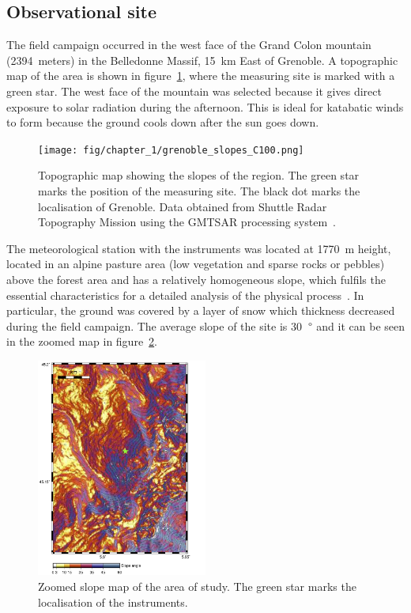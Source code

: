 \subsection{Observational site}

The field campaign occurred in the west face of the Grand Colon mountain (2394~meters) in the Belledonne Massif, 15~km East of Grenoble. A topographic map of the area is shown in figure~\ref{fig:obs_site}, where the measuring site is marked with a green star. The west face of the mountain was selected because it gives direct exposure to solar radiation during the afternoon. This is ideal for katabatic winds to form because the ground cools down after the sun goes down.

\begin{figure}[!ht]
  \begin{center}
  \texttt{[image: fig/chapter\_1/grenoble\_slopes\_C100.png]}
  \caption{Topographic map showing the slopes of the region. The green star marks the position of the measuring site. The black dot marks the localisation of Grenoble. Data obtained from Shuttle Radar Topography Mission using the GMTSAR processing system~\citep{sandwell2011gmtsar}.}
  \label{fig:obs_site}
  \end{center}
\end{figure}

The meteorological station with the instruments was located at 1770~m height, located in an alpine pasture area (low vegetation and sparse rocks or pebbles) above the forest area and
has a relatively homogeneous slope, which fulfils the essential characteristics for a detailed analysis of the physical process~\citep{blein2016observation}. In particular, the ground was covered by a layer of snow which thickness decreased during the field campaign. The average slope of the site is 30~$\degree$ and it can be seen in the zoomed map in figure~\ref{fig:obs_site_zoom}.

\begin{figure}[!ht]
  \begin{center}
  \includegraphics[width=0.5\textwidth]{fig/chapter_1/grenoble_slopes_C100_zoom.png}
  \caption{Zoomed slope map of the area of study. The green star marks the localisation of the instruments.}
  \label{fig:obs_site_zoom}
  \end{center}
\end{figure}


